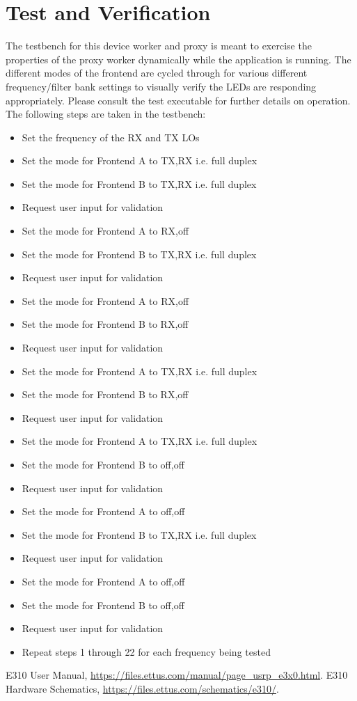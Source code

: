 \documentclass{article}
\begin{document}
\section*{Test and Verification}
The testbench for this device worker and proxy is meant to exercise the properties of the proxy worker dynamically while the application is running. The different modes of the frontend are cycled through for various different frequency/filter bank settings to visually verify the LEDs are responding appropriately. Please consult the test executable for further details on operation.
\\\medskip
The following steps are taken in the testbench:
	\begin{itemize}
		\item[1.] Set the frequency of the RX and TX LOs
		\item[2.] Set the mode for Frontend A to TX,RX i.e. full duplex
		\item[3.] Set the mode for Frontend B to TX,RX i.e. full duplex
		\item[4.] Request user input for validation
		\item[5.] Set the mode for Frontend A to RX,off
		\item[6.] Set the mode for Frontend B to TX,RX i.e. full duplex
		\item[7.] Request user input for validation
		\item[8.] Set the mode for Frontend A to RX,off
		\item[9.] Set the mode for Frontend B to RX,off
		\item[10.] Request user input for validation
		\item[11.] Set the mode for Frontend A to TX,RX i.e. full duplex
		\item[12.] Set the mode for Frontend B to RX,off
		\item[13.] Request user input for validation
		\item[14.] Set the mode for Frontend A to TX,RX i.e. full duplex
		\item[15.] Set the mode for Frontend B to off,off
		\item[16.] Request user input for validation
		\item[17.] Set the mode for Frontend A to off,off
		\item[18.] Set the mode for Frontend B to TX,RX i.e. full duplex
		\item[19.] Request user input for validation
		\item[20.] Set the mode for Frontend A to off,off
		\item[21.] Set the mode for Frontend B to off,off
		\item[22.] Request user input for validation
		\item[23.] Repeat steps 1 through 22 for each frequency being tested
	\end{itemize}

\begin{thebibliography}{2}
  E310 User Manual,
  \url{https://files.ettus.com/manual/page\_usrp\_e3x0.html}.
  E310 Hardware Schematics,
  \url{https://files.ettus.com/schematics/e310/}.
\end{thebibliography}
\end{document}
